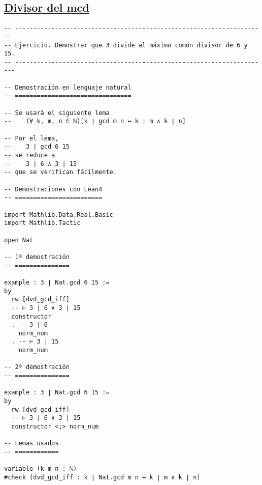 \subsection{\href{./src/Logica/Divisor\_del\_mcd.lean}{Divisor del mcd}}
\label{sec:org89e3c96}
\begin{verbatim}
-- ---------------------------------------------------------------------
-- Ejercicio. Demostrar que 3 divide al máximo común divisor de 6 y 15.
-- ----------------------------------------------------------------------

-- Demostración en lenguaje natural
-- ================================

-- Se usará el siguiente lema
--    (∀ k, m, n ∈ ℕ)[k ∣ gcd m n ↔ k ∣ m ∧ k ∣ n]
--
-- Por el lema,
--    3 ∣ gcd 6 15
-- se reduce a
--    3 ∣ 6 ∧ 3 ∣ 15
-- que se verifican fácilmente.

-- Demostraciones con Lean4
-- ========================

import Mathlib.Data.Real.Basic
import Mathlib.Tactic

open Nat

-- 1ª demostración
-- ===============

example : 3 ∣ Nat.gcd 6 15 :=
by
  rw [dvd_gcd_iff]
  -- ⊢ 3 ∣ 6 ∧ 3 ∣ 15
  constructor
  . -- 3 ∣ 6
    norm_num
  . -- ⊢ 3 ∣ 15
    norm_num

-- 2ª demostración
-- ===============

example : 3 ∣ Nat.gcd 6 15 :=
by
  rw [dvd_gcd_iff]
  -- ⊢ 3 ∣ 6 ∧ 3 ∣ 15
  constructor <;> norm_num

-- Lemas usados
-- ============

variable (k m n : ℕ)
#check (dvd_gcd_iff : k ∣ Nat.gcd m n ↔ k ∣ m ∧ k ∣ n)
\end{verbatim}

